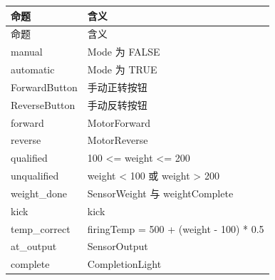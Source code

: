 \begin{longtable}{L{3.3cm}L{10.0cm}}

\toprule

命题 & 含义\\

\midrule

\endfirsthead

\toprule

命题 & 含义\\

\midrule

\endhead

{\ttfamily manual} & Mode 为 FALSE\\

{\ttfamily automatic} & Mode 为 TRUE\\

{\ttfamily ForwardButton} & 手动正转按钮\\

{\ttfamily ReverseButton} & 手动反转按钮\\

{\ttfamily forward} & MotorForward\\

{\ttfamily reverse} & MotorReverse\\

{\ttfamily qualified} & 100 <= weight <= 200\\

{\ttfamily unqualified} & weight < 100 或 weight > 200\\

{\ttfamily weight\_done} & SensorWeight 与 weightComplete\\

{\ttfamily kick} & kick\\

{\ttfamily temp\_correct} & firingTemp = 500 + (weight - 100) * 0.5\\

{\ttfamily at\_output} & SensorOutput\\

{\ttfamily complete} & CompletionLight\\

\bottomrule

\end{longtable}

